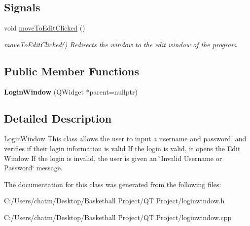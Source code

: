 \subsection*{Signals}
\begin{DoxyCompactItemize}
\item 
\mbox{\label{class_login_window_a0ed797ae07a4afea038499d6929047a1}} 
void \mbox{\hyperlink{class_login_window_a0ed797ae07a4afea038499d6929047a1}{move\+To\+Edit\+Clicked}} ()
\begin{DoxyCompactList}\small\item\em \mbox{\hyperlink{class_login_window_a0ed797ae07a4afea038499d6929047a1}{move\+To\+Edit\+Clicked()}} Redirects the window to the edit window of the program \end{DoxyCompactList}\end{DoxyCompactItemize}
\subsection*{Public Member Functions}
\begin{DoxyCompactItemize}
\item 
\mbox{\label{class_login_window_aa4c04d26b299de00156bbf3c32b2a082}} 
{\bfseries Login\+Window} (Q\+Widget $\ast$parent=nullptr)
\end{DoxyCompactItemize}


\subsection{Detailed Description}
\mbox{\hyperlink{class_login_window}{Login\+Window}} This class allows the user to input a username and password, and verifies if their login information is valid If the login is valid, it opens the Edit Window If the login is invalid, the user is given an \char`\"{}\+Invalid Username or Password\char`\"{} message. 

The documentation for this class was generated from the following files\+:\begin{DoxyCompactItemize}
\item 
C\+:/\+Users/chatm/\+Desktop/\+Basketball Project/\+Q\+T Project/loginwindow.\+h\item 
C\+:/\+Users/chatm/\+Desktop/\+Basketball Project/\+Q\+T Project/loginwindow.\+cpp\end{DoxyCompactItemize}
